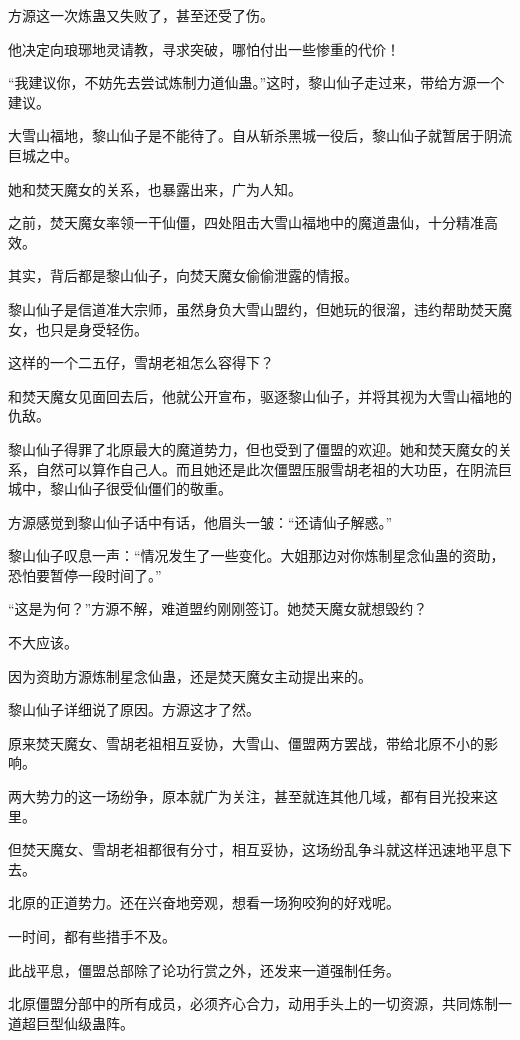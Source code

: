 \begin{this_body}
方源这一次炼蛊又失败了，甚至还受了伤。

他决定向琅琊地灵请教，寻求突破，哪怕付出一些惨重的代价！

“我建议你，不妨先去尝试炼制力道仙蛊。”这时，黎山仙子走过来，带给方源一个建议。

大雪山福地，黎山仙子是不能待了。自从斩杀黑城一役后，黎山仙子就暂居于阴流巨城之中。

她和焚天魔女的关系，也暴露出来，广为人知。

之前，焚天魔女率领一干仙僵，四处阻击大雪山福地中的魔道蛊仙，十分精准高效。

其实，背后都是黎山仙子，向焚天魔女偷偷泄露的情报。

黎山仙子是信道准大宗师，虽然身负大雪山盟约，但她玩的很溜，违约帮助焚天魔女，也只是身受轻伤。

这样的一个二五仔，雪胡老祖怎么容得下？

和焚天魔女见面回去后，他就公开宣布，驱逐黎山仙子，并将其视为大雪山福地的仇敌。

黎山仙子得罪了北原最大的魔道势力，但也受到了僵盟的欢迎。她和焚天魔女的关系，自然可以算作自己人。而且她还是此次僵盟压服雪胡老祖的大功臣，在阴流巨城中，黎山仙子很受仙僵们的敬重。

方源感觉到黎山仙子话中有话，他眉头一皱：“还请仙子解惑。”

黎山仙子叹息一声：“情况发生了一些变化。大姐那边对你炼制星念仙蛊的资助，恐怕要暂停一段时间了。”

“这是为何？”方源不解，难道盟约刚刚签订。她焚天魔女就想毁约？

不大应该。

因为资助方源炼制星念仙蛊，还是焚天魔女主动提出来的。

黎山仙子详细说了原因。方源这才了然。

原来焚天魔女、雪胡老祖相互妥协，大雪山、僵盟两方罢战，带给北原不小的影响。

两大势力的这一场纷争，原本就广为关注，甚至就连其他几域，都有目光投来这里。

但焚天魔女、雪胡老祖都很有分寸，相互妥协，这场纷乱争斗就这样迅速地平息下去。

北原的正道势力。还在兴奋地旁观，想看一场狗咬狗的好戏呢。

一时间，都有些措手不及。

此战平息，僵盟总部除了论功行赏之外，还发来一道强制任务。

北原僵盟分部中的所有成员，必须齐心合力，动用手头上的一切资源，共同炼制一道超巨型仙级蛊阵。


\end{this_body}
